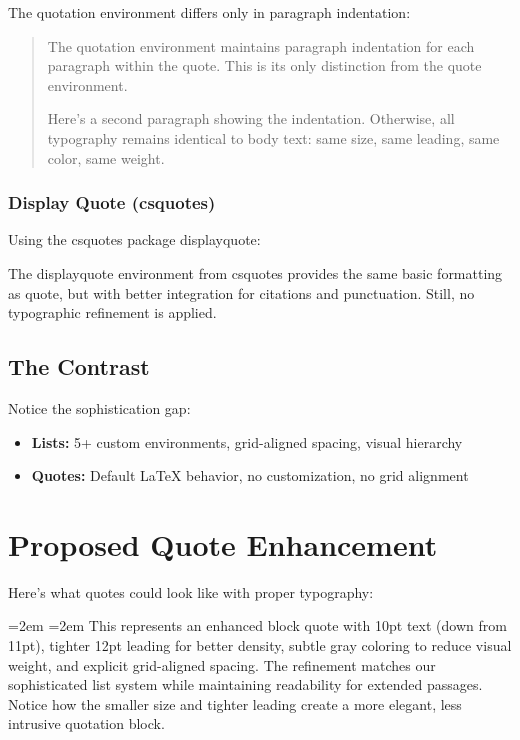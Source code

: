 \documentclass[11pt]{article}
\begin{document}
The quotation environment differs only in paragraph indentation:

\begin{quotation}
The quotation environment maintains paragraph indentation for each paragraph within the quote. This is its only distinction from the quote environment.

Here's a second paragraph showing the indentation. Otherwise, all typography remains identical to body text: same size, same leading, same color, same weight.
\end{quotation}

\subsubsection{Display Quote (csquotes)}

Using the csquotes package displayquote:

\begin{displayquote}
The displayquote environment from csquotes provides the same basic formatting as quote, but with better integration for citations and punctuation. Still, no typographic refinement is applied.
\end{displayquote}

\subsection{The Contrast}

Notice the sophistication gap:
\begin{itemize}
\item \textbf{Lists:} 5+ custom environments, grid-aligned spacing, visual hierarchy
\item \textbf{Quotes:} Default LaTeX behavior, no customization, no grid alignment
\end{itemize}

\section{Proposed Quote Enhancement}

Here's what quotes could look like with proper typography:

\begingroup
\par\vspace{6.6pt}%
\leftskip=2em \rightskip=2em
\small%
\linespread{1.09}\selectfont%
\color[gray]{0.45}%
\noindent
This represents an enhanced block quote with 10pt text (down from 11pt), tighter 12pt leading for better density, subtle gray coloring to reduce visual weight, and explicit grid-aligned spacing. The refinement matches our sophisticated list system while maintaining readability for extended passages. Notice how the smaller size and tighter leading create a more elegant, less intrusive quotation block.
\par\vspace{6.6pt}%
\endgroup
\end{document}
